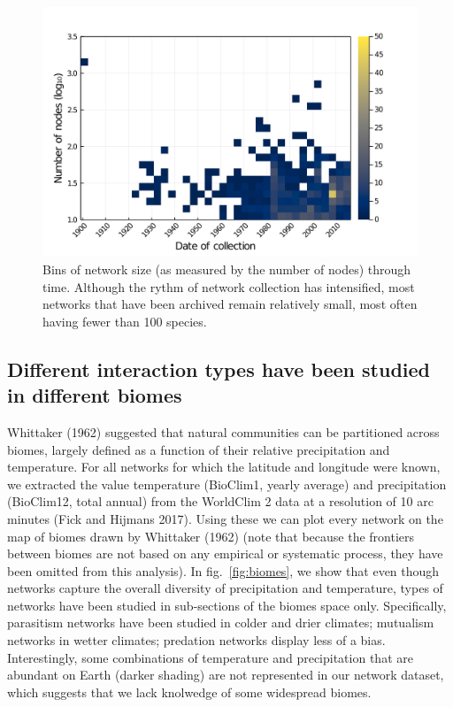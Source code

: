 \documentclass[11pt]{article}
\makeatletter
\def\maxwidth{\ifdim\Gin@nat@width>\linewidth\linewidth
\else\Gin@nat@width\fi}
\let\Oldincludegraphics\includegraphics
\renewcommand{\includegraphics}[1]{\Oldincludegraphics[width=\maxwidth]{#1}}
\makeatother
\begin{document}
\begin{figure}
\hypertarget{fig:size}{%
\centering
\includegraphics{figures/properties_over_time.png}
\caption{Bins of network size (as measured by the number of nodes)
through time. Although the rythm of network collection has intensified,
most networks that have been archived remain relatively small, most
often having fewer than 100 species.}\label{fig:size}
}
\end{figure}

\hypertarget{different-interaction-types-have-been-studied-in-different-biomes}{%
\subsection{Different interaction types have been studied in different
biomes}\label{different-interaction-types-have-been-studied-in-different-biomes}}

Whittaker (1962) suggested that natural communities can be partitioned
across biomes, largely defined as a function of their relative
precipitation and temperature. For all networks for which the latitude
and longitude were known, we extracted the value temperature (BioClim1,
yearly average) and precipitation (BioClim12, total annual) from the
WorldClim 2 data at a resolution of 10 arc minutes (Fick and Hijmans
2017). Using these we can plot every network on the map of biomes drawn
by Whittaker (1962) (note that because the frontiers between biomes are
not based on any empirical or systematic process, they have been omitted
from this analysis). In fig.~\ref{fig:biomes}, we show that even though
networks capture the overall diversity of precipitation and temperature,
types of networks have been studied in sub-sections of the biomes space
only. Specifically, parasitism networks have been studied in colder and
drier climates; mutualism networks in wetter climates; predation
networks display less of a bias. Interestingly, some combinations of
temperature and precipitation that are abundant on Earth (darker
shading) are not represented in our network dataset, which suggests that
we lack knolwedge of some widespread biomes.
\end{document}

